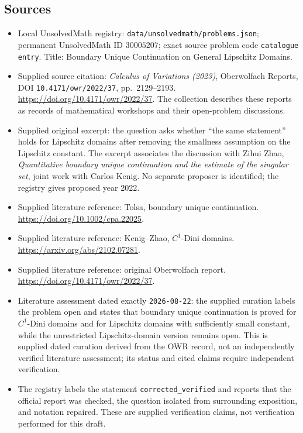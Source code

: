 \documentclass[11pt]{article}
\begin{document}
\subsection{Sources}
\begin{itemize}
\item Local UnsolvedMath registry: \texttt{data/unsolvedmath/problems.json}; permanent UnsolvedMath ID \(30005207\); exact source problem code \texttt{catalogue entry}. Title: Boundary Unique Continuation on General Lipschitz Domains.
\item Supplied source citation: \emph{Calculus of Variations (2023)}, Oberwolfach Reports, DOI \texttt{10.4171/owr/2022/37}, pp.\ 2129--2193. \url{https://doi.org/10.4171/owr/2022/37}. The collection describes these reports as records of mathematical workshops and their open-problem discussions.
\item Supplied original excerpt: the question asks whether ``the same statement'' holds for Lipschitz domains after removing the smallness assumption on the Lipschitz constant. The excerpt associates the discussion with Zihui Zhao, \emph{Quantitative boundary unique continuation and the estimate of the singular set}, joint work with Carlos Kenig. No separate proposer is identified; the registry gives proposed year 2022.
\item Supplied literature reference: Tolsa, boundary unique continuation. \url{https://doi.org/10.1002/cpa.22025}.
\item Supplied literature reference: Kenig--Zhao, \(C^1\)-Dini domains. \url{https://arxiv.org/abs/2102.07281}.
\item Supplied literature reference: original Oberwolfach report. \url{https://doi.org/10.4171/owr/2022/37}.
\item Literature assessment dated exactly \texttt{2026-08-22}: the supplied curation labels the problem open and states that boundary unique continuation is proved for \(C^1\)-Dini domains and for Lipschitz domains with sufficiently small constant, while the unrestricted Lipschitz-domain version remains open. This is supplied dated curation derived from the OWR record, not an independently verified literature assessment; its status and cited claims require independent verification.
\item The registry labels the statement \texttt{corrected\_verified} and reports that the official report was checked, the question isolated from surrounding exposition, and notation repaired. These are supplied verification claims, not verification performed for this draft.
\end{itemize}
\end{document}
